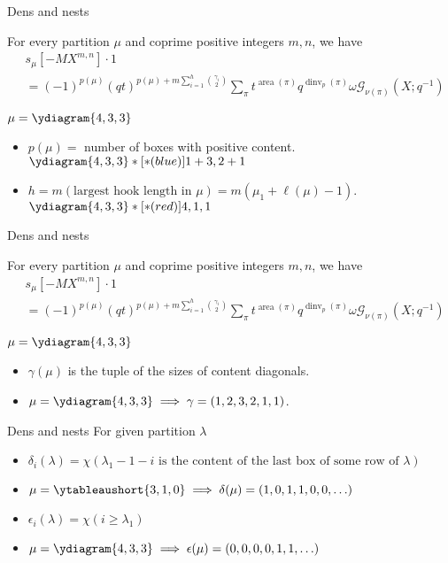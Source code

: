 \documentclass{beamer}
\DeclareMathOperator{\area}{area}
\DeclareMathOperator{\dinv}{dinv}
\newcommand{\Gcal}{\mathcal{G}}
\newcounter{c}
\begin{document}
\begin{frame}{Dens and nests}
  \begin{theorem}
    For every partition \(\mu\) and coprime positive integers \(m,n\),
    we have 
    \begin{align*}
      & s_\mu[-MX^{m,n}] \cdot 1 \\ & = (-1)^{p(\mu)}
      (qt)^{p(\mu)+m \sum_{i=1}^h \binom{\gamma_i}{2}}\sum_\pi t^{\area(\pi)}
      q^{\dinv_p(\pi)} \omega \Gcal_{\nu(\pi)}(X;q^{-1})
    \end{align*}
  \end{theorem}
  \(\mu = \ydiagram{4,3,3}\)\pause
  \begin{itemize}
  \item \(p(\mu) = \) number of boxes with positive content. \(\ydiagram{4,3,3}*[*(blue)]{1+3,2+1}\) \pause
  \item \(h = m (\text{largest hook length in }\mu) =
    m(\mu_1+\ell(\mu)-1)\). \(\ydiagram{4,3,3}*[*(red)]{4,1,1}\)\pause
  \end{itemize}
\end{frame}
\begin{frame}{Dens and nests}
  \begin{theorem}
    For every partition \(\mu\) and coprime positive integers \(m,n\),
    we have 
    \begin{align*}
      & s_\mu[-MX^{m,n}] \cdot 1 \\ & = (-1)^{p(\mu)}
      (qt)^{p(\mu)+m \sum_{i=1}^h \binom{\gamma_i}{2}}\sum_\pi t^{\area(\pi)}
      q^{\dinv_p(\pi)} \omega \Gcal_{\nu(\pi)}(X;q^{-1})
    \end{align*}
  \end{theorem}
  \(\mu = \ydiagram{4,3,3}\)
  \begin{itemize}
  \item \(\gamma(\mu)\) is the tuple of the sizes of content diagonals.\pause 
  \item \(\mu=\ydiagram{4,3,3} \implies \gamma=(1,2,3,2,1,1)\).
  \end{itemize}
\end{frame}
\begin{frame}{Dens and nests}
  For given partition \(\lambda\)
  \begin{itemize}
  \item \(\delta_i(\lambda) = \chi(\lambda_1-1-i \text{ is the content
    of the last box of some row of }\lambda)\)  \pause
  \item \(\mu = \ytableaushort{{}{}{}3,{}{}1,{}{}0} \implies \delta(\mu) =
    (1,0,1,1,0,0,\ldots)\) \pause
  \item \(\epsilon_i(\lambda) = \chi(i \geq \lambda_1)\) \pause
  \item \(\mu = \ydiagram{4,3,3} \implies \epsilon(\mu) = (0,0,0,0,1,1,\ldots)\)
  \end{itemize}
\end{frame}
\end{document}
